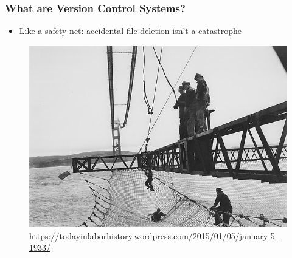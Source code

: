 \begin{frame}[fragile]
\frametitle{What are Version Control Systems?}
    \begin{itemize}
        \item Like a safety net: accidental file deletion isn't a catastrophe
    \end{itemize}
    \begin{figure}
        \centerline{%
            \includegraphics[height=0.65\textheight]{images/safety_net_golden_gate_bridge.jpg}}
            \caption{\tiny \url{https://todayinlaborhistory.wordpress.com/2015/01/05/january-5-1933/}}
    \end{figure}

\end{frame}

